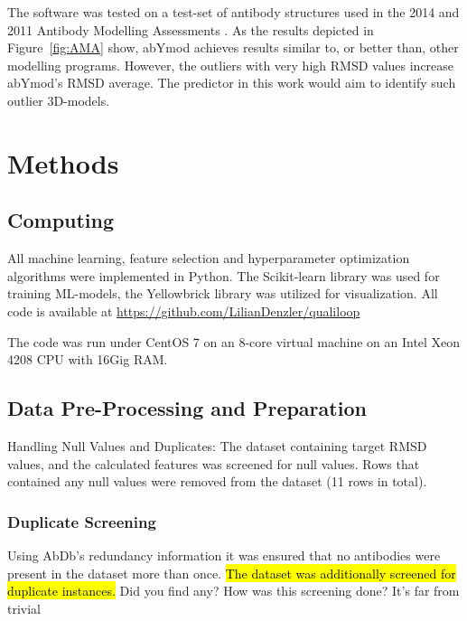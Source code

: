 \documentclass[12pt]{article}
\newcommand{\lilian}[1]{ {\color{red}{\bfseries Lilian:} #1}}
\newcommand{\highlight}[1]{\hl{#1}}
\begin{document}
The software
was tested on a test-set of antibody structures used in the 2014 and
2011 Antibody Modelling Assessments
\cite{Almagro2011,Almagro2014}. As the results depicted in
Figure~\ref{fig:AMA} show, abYmod achieves results similar to, or better than,
other modelling programs. However, the outliers with very high RMSD
values increase abYmod's RMSD average. The predictor in this work
would aim to identify such outlier 3D-models.


\section{Methods}

\subsection{Computing}
All machine learning, feature selection and hyperparameter
optimization algorithms were implemented in Python. The Scikit-learn
library was used for training ML-models, the
Yellowbrick\cite{Bengfort2021} library was utilized for
visualization. All code is available at
\url{https://github.com/LilianDenzler/qualiloop}

The code was run under CentOS 7 on an 8-core virtual machine on an
Intel Xeon 4208 CPU with 16Gig RAM.

\subsection{Data Pre-Processing and Preparation}
Handling Null Values and Duplicates: The dataset containing target
RMSD values, and the calculated features was screened for null
values.
Rows that contained any null values were
removed from the dataset (11 rows in total).

\subsubsection{Duplicate Screening}
Using AbDb's redundancy information it was ensured that no antibodies
were present in the dataset more than once. \highlight{The dataset was
  additionally screened for duplicate instances.}
\lilian{Did you find any? How was this screening done? It's far from trivial}
\end{document}
